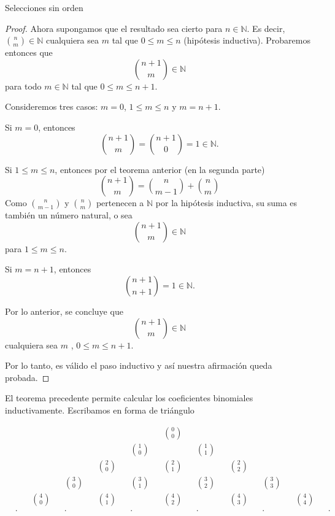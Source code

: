 \begin{section}{Selecciones sin orden}
\begin{proof}
Ahora supongamos que el resultado sea cierto  para $n \in \mathbb N$. Es decir, $\binom{n}{m} \in \mathbb N$ cualquiera sea $m$ tal que $0 \le m \le n$ (hipótesis inductiva). Probaremos entonces que 
\begin{equation*}
    \binom{n+1}{m} \in \mathbb N
\end{equation*}
 para todo  $m \in \mathbb{N}$ tal que $0 \le m \le n+1$. 
 
Consideremos tres casos: $m=0$,\; $1 \le m \le n$\; y \;$m = n+1$.

Si $m=0$, entonces
\begin{equation*}
    \binom{n+1}{m} = \binom{n+1}{0} =1 \in \mathbb N.
\end{equation*}


Si $1 \le m \le n$, entonces por el teorema anterior (en la segunda parte)
$$
\binom{n+1}{m} = \binom{n}{m-1} + \binom{n}{m}  
$$
Como 
$\binom{n}{m-1}$  y $\binom{n}{m}$ pertenecen  a $\mathbb  N$ por la hipótesis inductiva, su suma es también un número natural, o sea 
\begin{equation*}
    \binom{n+1}{m}   \in \mathbb N
\end{equation*}
para $1 \le m \le n$.


Si $m = n+1$, entonces 
\begin{equation*}
    \binom{n+1}{n+1} = 1  \in \mathbb N.
\end{equation*}


Por lo anterior, se concluye que
$$
\binom{n+1}{m}   \in \mathbb N
$$
cualquiera sea $m$ , $0 \le m \le n + 1$.

Por lo tanto, es válido el paso inductivo y así nuestra afirmación
queda probada.
\end{proof}

El teorema precedente permite calcular los coeficientes
binomiales inductivamente. Escribamos en forma de triángulo


\begin{align*}
&& && && && && &\binom{0}{0}& && && && && &&  \\
&& && && && &\binom{1}{0}& && &\binom{1}{1}& && && && &&  \\
&& && && &\binom{2}{0}& && &\binom{2}{1}& && &\binom{2}{2}& && && &&  \\
&& && &\binom{3}{0}& && &\binom{3}{1}& && &\binom{3}{2}& && &\binom{3}{3}& && &&  \\
&& &\binom{4}{0}& && &\binom{4}{1}& && &\binom{4}{2}& && &\binom{4}{3}& && &\binom{4}{4}& &&  \\
&\cdot& && &\cdot& && &\cdot& && &\cdot& && &\cdot& && &\cdot& 
\end{align*}




\end{section}
